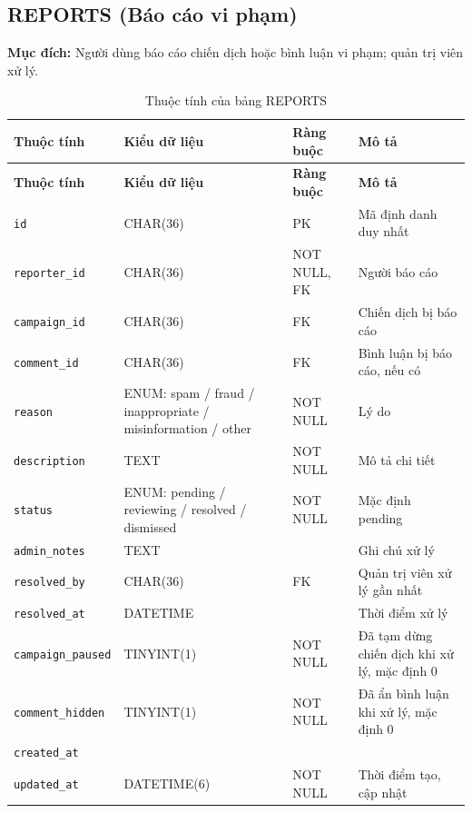 \subsection{REPORTS (Báo cáo vi phạm)}

\textbf{Mục đích:} Người dùng báo cáo chiến dịch hoặc bình luận vi phạm; quản trị viên xử lý.

{\small
\begin{longtable}{|P{3.2cm}|P{2.8cm}|P{2.2cm}|p{5.4cm}|}
    \caption{Thuộc tính của bảng REPORTS}
    \label{tab:reports} \\
    \hline
    \textbf{Thuộc tính} & \textbf{Kiểu dữ liệu} & \textbf{Ràng buộc} & \textbf{Mô tả} \\
    \hline
    \endfirsthead
    \hline
    \textbf{Thuộc tính} & \textbf{Kiểu dữ liệu} & \textbf{Ràng buộc} & \textbf{Mô tả} \\
    \hline
    \endhead

    \texttt{id} & CHAR(36) & PK & Mã định danh duy nhất \\
    \hline
    \texttt{reporter\_\allowbreak{}id} & CHAR(36) & NOT NULL, FK & Người báo cáo \\
    \hline
    \texttt{campaign\_\allowbreak{}id} & CHAR(36) & FK & Chiến dịch bị báo cáo \\
    \hline
    \texttt{comment\_\allowbreak{}id} & CHAR(36) & FK & Bình luận bị báo cáo, nếu có \\
    \hline
    \texttt{reason} & ENUM: spam / fraud / inappropriate / misinformation / other & NOT NULL & Lý do \\
    \hline
    \texttt{description} & TEXT & NOT NULL & Mô tả chi tiết \\
    \hline
    \texttt{status} & ENUM: pending / reviewing / resolved / dismissed & NOT NULL & Mặc định pending \\
    \hline
    \texttt{admin\_\allowbreak{}notes} & TEXT &  & Ghi chú xử lý \\
    \hline
    \texttt{resolved\_\allowbreak{}by} & CHAR(36) & FK & Quản trị viên xử lý gần nhất \\
    \hline
    \texttt{resolved\_\allowbreak{}at} & DATETIME &  & Thời điểm xử lý \\
    \hline
    \texttt{campaign\_\allowbreak{}paused} & TINYINT(1) & NOT NULL & Đã tạm dừng chiến dịch khi xử lý, mặc định 0 \\
    \hline
    \texttt{comment\_\allowbreak{}hidden} & TINYINT(1) & NOT NULL & Đã ẩn bình luận khi xử lý, mặc định 0 \\
    \hline
    \texttt{created\_\allowbreak{}at} &  &  &  \\
    \hline
    \texttt{updated\_\allowbreak{}at} & DATETIME(6) & NOT NULL & Thời điểm tạo, cập nhật \\
    \hline
\end{longtable}
}

